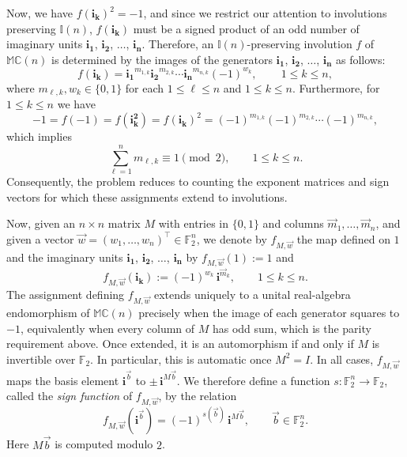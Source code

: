\documentclass[12pt]{amsart}
\theoremstyle{plain}
\theoremstyle{definition}
\numberwithin{equation}{section}
\newcommand{\im}[1]{\mathbf{ i_{#1}}}
\newcommand{\ims}[1]{\mathbf{ i_{#1}^2}}
\newcommand{\mC}{\mathbb{C}}
\newcommand{\mM}{\mathbb{M}}
\newcommand{\mI}{\mathbb{I}}
\newcommand{\ra}{\rightarrow}
\begin{document}
    Now, we have $f(\im{k})^2 = -1$, and since we restrict our attention to involutions preserving $\mI(n)$, $f(\im{k})$ must be a signed product of an odd number of imaginary units $\im{1}$, $\im{2}$, $\ldots$, $\im{n}$. Therefore, an $\mI(n)$-preserving involution $f$ of $\mM \mC(n)$ is determined by the images of the generators $\im{1}$, $\im{2}$, $\ldots$, $\im{n}$ as follows:
\[
f(\im{k})=\im{1}^{m_{1,k}}\im{2}^{m_{2,k}}\cdots \im{n}^{ m_{n,k}}(-1)^{w_{k}},\qquad\, 1\le k\le n,
\]
where $m_{\ell, k}, w_k \in \{ 0 , 1 \}$ for each $1 \leq \ell \leq n$ and $1 \leq k \leq n$. Furthermore, for $1\le k \le n$ we have
\[
-1=f(-1)=f(\ims{k})=f(\im{k})^2=(-1)^{m_{1,k}}(-1)^{m_{2,k}}\cdots (-1)^{m_{n,k}},
\]
which implies 
\[
\sum_{\ell=1}^n m_{\ell, k}\equiv 1\pmod{2},\qquad 1\le k\le n. 
\]
Consequently, the problem reduces to counting the exponent matrices and sign vectors for which these assignments extend to involutions. 

Now, given an $n \times n$ matrix $M$ with entries in $\{0,1\}$ and columns $\vec{m}_1,\ldots,\vec{m}_n$, and given a vector $\vec w=(w_1,\ldots,w_n)^\top\in\mathbb F_2^n$, we denote by $f_{M,\vec w}$ the map defined on $1$ and the imaginary units $\im{1}$, $\im{2}$, $\ldots$, $\im{n}$ by $f_{M, \vec w} (1) := 1$ and
\[
f_{M,\vec w}(\im{k}):=(-1)^{w_k}\,\mathbf i^{\vec{m}_k},\qquad 1\le k\le n.
\]
The assignment defining $f_{M,\vec w}$ extends uniquely to a unital real-algebra endomorphism of $\mM \mC(n)$ precisely when the image of each generator squares to $-1$, equivalently when every column of $M$ has odd sum, which is the parity requirement above. Once extended, it is an automorphism if and only if $M$ is invertible over $\mathbb F_2$. In particular, this is automatic once $M^2=I$. In all cases, $f_{M,\vec w}$ maps the basis element $\mathbf i^{\vec b}$ to $\pm\, \mathbf i^{M \vec b}$. We therefore define a function $s : \mathbb F_2^n \ra \mathbb F_2$, called the \emph{sign function} of $f_{M,\vec w}$, by the relation
\begin{equation}\label{Eq:SignFunction}
f_{M,\vec w}(\mathbf i^{\vec b})=(-1)^{s(\vec b)}\,\mathbf i^{M\vec b}, \qquad \vec b \in \mathbb F_2^n.
\end{equation}
Here $M\vec b$ is computed modulo $2$.
\end{document}
